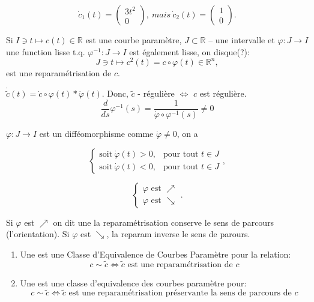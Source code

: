	$$ \dot{c}_1(t) = \left( \begin{array}{c} 3t^2 \\ 0 \end{array} \right),\ mais\ \dot{c}_2(t) = \left( \begin{array}{c} 1 \\ 0 \end{array} \right).$$

	\begin{definition} Si $I\ni t \mapsto c(t)\in \mathbb{R}$ est une courbe paramètre, $J\subset \mathbb{R}$ -- une intervalle et $\varphi: J\rightarrow I$ une function lisse t.q. $\varphi^{-1}: J\rightarrow I$ est également lisse, on disque(?):
		$$J\ni t \mapsto c^2(t) = c\circ\varphi(t) \in \mathbb{R}^n,$$
		est une reparamétrisation  de  $c$.
	\end{definition}

\begin{remark}  
	$\dot{\tilde{c}}(t)=\dot{c}\circ\varphi(t)*\dot{\varphi}(t)$. Donc,
	$\tilde{c}$ - régulière $\Longleftrightarrow$ $c$ est régulière.
	$$\frac{d}{ds}\varphi^{-1}(s)=\frac{1}{\dot{\varphi}\circ\varphi^{-1}(s)}\neq 0$$

	$\varphi: J\rightarrow I$ est un difféomorphisme comme $\dot{\varphi}\neq0$, on a

	$$\left\{\begin{array}{rl}
	\mbox{soit}\ \dot{\varphi}(t)>0, & \mbox{pour tout } t\in J \\ 
	\mbox{soit}\ \dot{\varphi}(t)<0, & \mbox{pour tout } t\in J 
	\end{array}\right.,$$

	$$\left\{\begin{array}{rl}
	\varphi\mbox{ est } \nearrow \\ 
	\varphi\mbox{ est } \searrow
	\end{array}\right..$$

	Si $\varphi$ est $\nearrow$ on dit une la reparamétrisation conserve le sens de parcours (l'orientation).
	Si $\varphi$ est $\searrow$, la reparam inverse le sens de parours.
\end{remark}

	\begin{definition}
		\leavevmode
		\begin{enumerate}
			\item Une  est une Classe d'Equivalence de Courbes Paramètre pour la relation:
			$$c\sim \tilde{c}\Longleftrightarrow\tilde{c}\mbox{ est une reparamétrisation de }c$$
			\item Une  est une classe d'equivalence des courbes paramètre pour:
			$$c\sim \tilde{c}\Longleftrightarrow\tilde{c}\mbox{ est une reparamétrisation préservante la sens de parcours de }c$$
		\end{enumerate}
	\end{definition}

